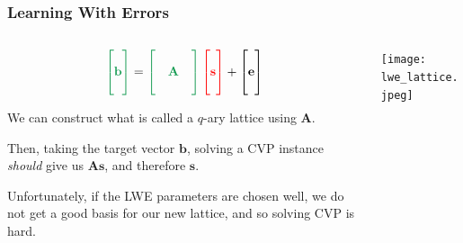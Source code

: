 \documentclass[
aspectratio=169, %
t, %
onlytextwidth, %
10pt, %
]{beamer}
\begin{document}

\begin{frame}
    \frametitle{Learning With Errors}
    \begin{columns}[T] %
        \begin{column}{0.48\linewidth} %
            \begin{tcolorbox}[colback=ICLBlue!5!white,colframe=ICLBlue,title=Learning With Errors Problem (LWE)]
                \[
                    \color{ForestGreen} \begin{bmatrix} \\ \mathbf{b} \\ \\ \end{bmatrix} \color{black} = \color{ForestGreen} \begin{bmatrix} & & \\ & \mathbf{A} & \\ & & \end{bmatrix} \color{red} \begin{bmatrix} \\  \mathbf{s} \\ \\ \end{bmatrix} \color{black} + \begin{bmatrix} \\ \mathbf{e} \\ \\ \end{bmatrix}
                \]
            \end{tcolorbox}

            We can construct what is called a $q$-ary lattice using $\mathbf{A}$.

            Then, taking the target vector $\mathbf{b}$, solving a CVP instance \textit{should} give us $\mathbf{As}$, and therefore $\mathbf{s}$.

            Unfortunately, if the LWE parameters are chosen well, we do not get a good basis for our new lattice, and so solving CVP is hard.
        \end{column}
        \begin{column}{0.48\linewidth} %
            \texttt{[image: lwe\_lattice.jpeg]} %
        \end{column}
    \end{columns}
\end{frame}
\end{document}
